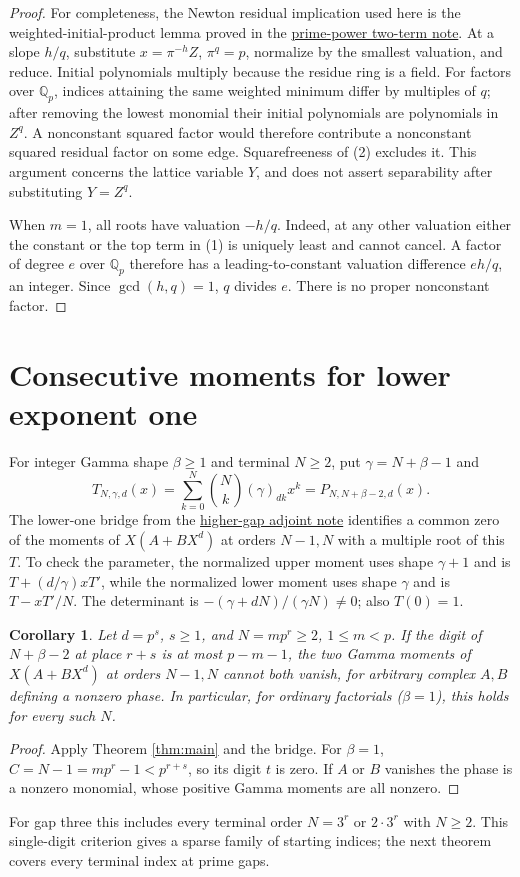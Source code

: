 \documentclass[11pt]{article}
\newtheorem{corollary}[theorem]{Corollary}
\begin{document}
\begin{proof}
For completeness, the Newton residual implication used here is the
weighted-initial-product lemma proved in the
\href{PRIME_POWER_TWO_TERM_SFC.tex}{prime-power two-term note}.
At a slope $h/q$, substitute $x=\pi^{-h}Z$, $\pi^q=p$,
normalize by the smallest valuation, and reduce. Initial polynomials
multiply because the residue ring is a field. For factors over
$\mathbb Q_p$, indices attaining the same weighted minimum differ by
multiples of $q$; after removing the lowest monomial their initial
polynomials are polynomials in $Z^q$. A nonconstant squared factor
would therefore contribute a nonconstant squared residual factor on
some edge. Squarefreeness of (2) excludes it.
This argument concerns the lattice variable $Y$, and does not assert
separability after substituting $Y=Z^q$.

When $m=1$, all roots have valuation $-h/q$. Indeed, at any other
valuation either the constant or the top term in (1) is uniquely
least and cannot cancel. A factor of degree $e$ over $\mathbb Q_p$
therefore has a leading-to-constant valuation difference $eh/q$,
an integer. Since $\gcd(h,q)=1$, $q$ divides $e$.
There is no proper nonconstant factor.
\end{proof}

\section{Consecutive moments for lower exponent one}
For integer Gamma shape $\beta\ge1$ and terminal $N\ge2$, put
$\gamma=N+\beta-1$ and
\[
 T_{N,\gamma,d}(x)=\sum_{k=0}^N\binom Nk(\gamma)_{dk}x^k
                =P_{N,N+\beta-2,d}(x).
\]
The lower-one bridge from the
\href{HIGHER_GAP_ADJOINT_RANK.tex}{higher-gap adjoint note}
identifies a common zero of the moments of $X(A+BX^d)$ at orders
$N-1,N$ with a multiple root of this $T$. To check the parameter,
the normalized upper moment uses shape $\gamma+1$ and is
$T+(d/\gamma)xT'$, while the normalized lower moment uses shape
$\gamma$ and is $T-xT'/N$. The determinant is
$-(\gamma+dN)/(\gamma N)\ne0$; also $T(0)=1$.

\begin{corollary}\label{cor:lowerone}
Let $d=p^s$, $s\ge1$, and $N=mp^r\ge2$, $1\le m<p$.
If the digit of $N+\beta-2$ at place $r+s$ is at most $p-m-1$,
the two Gamma moments of $X(A+BX^d)$ at orders $N-1,N$
cannot both vanish, for arbitrary complex $A,B$ defining a nonzero
phase. In particular, for ordinary factorials ($\beta=1$), this
holds for every such $N$.
\end{corollary}
\begin{proof}
Apply Theorem \ref{thm:main} and the bridge.
For $\beta=1$, $C=N-1=mp^r-1<p^{r+s}$, so its digit $t$ is zero.
If $A$ or $B$ vanishes the phase is a nonzero monomial, whose
positive Gamma moments are all nonzero.
\end{proof}
For gap three this includes every terminal order $N=3^r$ or $2\cdot3^r$
with $N\ge2$. This single-digit criterion gives a sparse family of starting
indices; the next theorem covers every terminal index at prime gaps.
\end{document}
